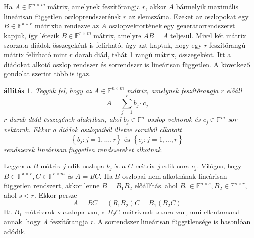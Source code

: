 \documentclass[9pt, a4paper, showtrims]{memoir}
\makeatletter
\renewenvironment{proof}[1][\proofname]
    {\par\pushQED{\qed}%
    \normalfont \topsep6\p@\@plus6\p@\relax
    \trivlist
    \item[\hskip\labelsep
        \itshape
    #1\@addpunct{:}]\ignorespaces}
    {\popQED\endtrivlist\@endpefalse}
\theoremstyle{plain}
\newtheorem{proposition}{állítás}[chapter]
\theoremstyle{remark}
\theoremstyle{definition}
\makeatother
\begin{document}
Ha $A\in\mathbb{F}^{n\times m}$ mátrix, amelynek feszítőrangja $r$, 
akkor $A$ bármelyik maximális lineárisan független oszloprendszerének $r$ az elemszáma.
Ezeket az oszlopokat egy $B\in\mathbb{F}^{n\times r}$ mátrixba rendezve az $A$ oszlopvektortének
egy generátorrendszerét kapjuk, 
így létezik $B\in\mathbb{F}^{r\times m}$ mátrix, amelyre $AB=A$ teljesül.
Mivel két mátrix szorzata diádok összegeként is felírható, 
úgy azt kaptuk, hogy egy $r$ feszítőrangú mátrix felírható mint $r$ darab diád,
tehát 1 rangú mátrix, összegeként. 
Itt a diádokat alkotó oszlop rendszer és sorrendszer is lineárisan független.
A következő gondolat szerint több is igaz.
\begin{proposition}
    Tegyük fel, hogy az $A\in\mathbb{F}^{n\times m}$ mátrix, amelynek feszítőrangja $r$ előáll
    \[
    A=\sum_{j=1}^rb_j\cdot c_j
    \]
    $r$ darab diád összegének alakjában, 
    ahol $b_j\in\mathbb{F}^n$ oszlop vektorok és $c_j\in\mathbb{F}^m$ sor vektorok.
    Ekkor a diádok oszlopaiból illetve soraiból alkotott 
    \[
        \left\{ b_j:j=1,\dots,r \right\} \text{ és }
        \left\{ c_j:j=1,\dots,r \right\}
    \] 
    rendszerek lineárisan független rendszereket alkotnak.
\end{proposition}
\begin{proof}
    Legyen a $B$ mátrix $j$-edik oszlopa $b_j$ és a $C$ mátrix $j$-edik sora $c_j$.
    Világos, hogy $B\in\mathbb{F}^{n\times r}, C\in\mathbb{F}^{r\times m}$ és 
    $A=BC$.
    Ha $B$ oszlopai nem alkotnának lineárisan független rendszert, akkor 
    lenne $B=B_1B_2$ előállítás, 
    ahol $B_1\in\mathbb{F}^{n\times s}, B_2\in\mathbb{F}^{s\times r}$,
    ahol $s<r$.
    Ekkor persze
    \[
        A=BC=\left( B_1B_2 \right)C=B_1\left( B_2C \right)
    \]
    Itt $B_1$ mátrixnak $s$ oszlopa van, a
    $B_2C$ mátrixnak $s$ sora van,
    ami ellentomond annak, hogy $A$ feszítőrangja $r$.
    A sorrendszer lineárisan függetlensége is hasonlóan adódik.
\end{proof}
\end{document}
